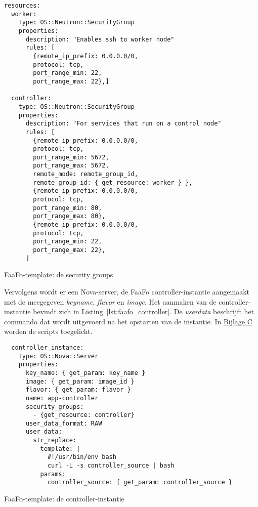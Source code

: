 \begin{code}
\begin{verbatim}
resources:
  worker:
    type: OS::Neutron::SecurityGroup
    properties:
      description: "Enables ssh to worker node"
      rules: [
        {remote_ip_prefix: 0.0.0.0/0,
        protocol: tcp,
        port_range_min: 22,
        port_range_max: 22},]

  controller:
    type: OS::Neutron::SecurityGroup
    properties:
      description: "For services that run on a control node"
      rules: [
        {remote_ip_prefix: 0.0.0.0/0,
        protocol: tcp,
        port_range_min: 5672,
        port_range_max: 5672,
        remote_mode: remote_group_id,
        remote_group_id: { get_resource: worker } },
        {remote_ip_prefix: 0.0.0.0/0,
        protocol: tcp,
        port_range_min: 80,
        port_range_max: 80},
        {remote_ip_prefix: 0.0.0.0/0,
        protocol: tcp,
        port_range_min: 22,
        port_range_max: 22},
      ]
\end{verbatim}
\caption{FaaFo-template: de security groups}
\label{lst:faafo_sec}
\end{code}

Vervolgens wordt er een Nova-server, de FaaFo controller-instantie aangemaakt met de meegegeven \textit{key\textunderscore name}, \textit{flavor} en \textit{image}. Het aanmaken van de controller-instantie bevindt zich in Listing~\ref{lst:faafo_controller}. De \textit{user\textunderscore data} beschrijft het commando dat wordt uitgevoerd na het opstarten van de instantie. In \hyperref[att:scripts]{Bijlage C} worden de scripts toegelicht.

\begin{code}
\begin{verbatim}
  controller_instance:
    type: OS::Nova::Server
    properties:
      key_name: { get_param: key_name }
      image: { get_param: image_id }
      flavor: { get_param: flavor }
      name: app-controller
      security_groups:
        - {get_resource: controller}
      user_data_format: RAW
      user_data:
        str_replace:
          template: |
            #!/usr/bin/env bash
            curl -L -s controller_source | bash
          params:
            controller_source: { get_param: controller_source }
\end{verbatim}
\caption{FaaFo-template: de controller-instantie}
\label{lst:faafo_controller}
\end{code}

